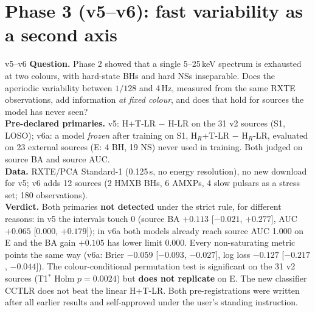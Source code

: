 \chapter{Phase 3 (v5--v6): fast variability as a second axis}\label{ch:phase3}

\begin{glance}{v5--v6}
\textbf{Question.} Phase 2 showed that a single 5--25\,keV spectrum is exhausted at two colours, with hard-state BHs and
hard NSs inseparable. Does the aperiodic variability between $1/128$ and 4\,Hz, measured from the same RXTE
observations, add information \emph{at fixed colour}, and does that hold for sources the model has never seen? \\
\textbf{Pre-declared primaries.} v5: H+T-LR $-$ H-LR on the 31 v2 sources (S1, LOSO); v6a: a model \emph{frozen} after
training on S1, H$_R$+T-LR $-$ H$_R$-LR, evaluated on 23 external sources (E: 4 BH, 19 NS) never used in training.
Both judged on source BA and source AUC. \\
\textbf{Data.} RXTE/PCA Standard-1 (0.125\,s, no energy resolution), no new download for v5; v6 adds 12 sources
(2 HMXB BHs, 6 AMXPs, 4 slow pulsars as a stress set; 180 observations). \\
\textbf{Verdict.} Both primaries \textbf{not detected} under the strict rule, for different reasons: in v5 the
intervals touch 0 (source BA $+0.113$ [$-0.021$, $+0.277$], AUC $+0.065$ [0.000, $+0.179$]); in v6a both models already
reach source AUC 1.000 on E and the BA gain $+0.105$ has lower limit 0.000. Every non-saturating metric points the same
way (v6a: Brier $-0.059$ [$-0.093$, $-0.027$], log loss $-0.127$ [$-0.217$, $-0.044$]). The colour-conditional
permutation test is significant on the 31 v2 sources (T1$^*$ Holm $p=0.0024$) but \textbf{does not replicate} on E.
The new classifier CCTLR does not beat the linear H+T-LR. Both pre-registrations were written after all earlier results
and self-approved under the user's standing instruction.
\end{glance}

